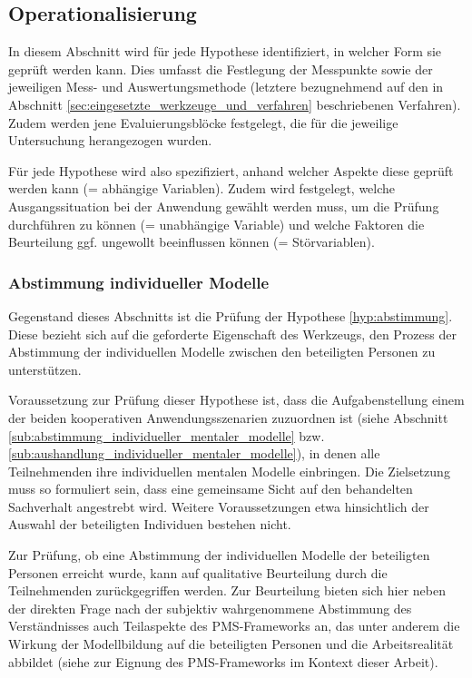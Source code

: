 \subsection{Operationalisierung} %
\label{sub:a_operationalisierung}

In diesem Abschnitt wird für jede Hypothese identifiziert, in welcher Form sie geprüft werden kann. Dies umfasst die Festlegung der Messpunkte sowie der jeweiligen Mess- und Auswertungsmethode (letztere bezugnehmend auf den in Abschnitt \ref{sec:eingesetzte_werkzeuge_und_verfahren} beschriebenen Verfahren). Zudem werden jene Evaluierungsblöcke festgelegt, die für die jeweilige Untersuchung herangezogen wurden.

Für jede Hypothese wird also spezifiziert, anhand welcher Aspekte diese geprüft werden kann (= abhängige Variablen). Zudem wird festgelegt, welche Ausgangssituation bei der Anwendung gewählt werden muss, um die Prüfung durchführen zu können (= unabhängige Variable) und welche Faktoren die Beurteilung ggf. ungewollt beeinflussen können (= Störvariablen).

\subsubsection{Abstimmung individueller Modelle} %
\label{ssub:abstimmung_individueller_modelle}

Gegenstand dieses Abschnitts ist die Prüfung der Hypothese \ref{hyp:abstimmung}. Diese bezieht sich auf die geforderte Eigenschaft des Werkzeugs, den Prozess der Abstimmung der individuellen Modelle zwischen den beteiligten Personen zu unterstützen.

Voraussetzung zur Prüfung dieser Hypothese ist, dass die Aufgabenstellung einem der beiden kooperativen Anwendungsszenarien zuzuordnen ist (siehe Abschnitt \ref{sub:abstimmung_individueller_mentaler_modelle} bzw. \ref{sub:aushandlung_individueller_mentaler_modelle}), in denen alle Teilnehmenden ihre individuellen mentalen Modelle einbringen. Die Zielsetzung muss so formuliert sein, dass eine gemeinsame Sicht auf den behandelten Sachverhalt angestrebt wird. Weitere Voraussetzungen etwa hinsichtlich der Auswahl der beteiligten Individuen bestehen nicht.

Zur Prüfung, ob eine Abstimmung der individuellen Modelle der beteiligten Personen erreicht wurde, kann auf qualitative Beurteilung durch die Teilnehmenden zurückgegriffen werden. Zur Beurteilung bieten sich hier neben der direkten Frage nach der subjektiv wahrgenommene Abstimmung des Verständnisses auch Teilaspekte des \gls{PMS}-Frameworks \citep{Sedera02} an, das unter anderem die Wirkung der Modellbildung auf die beteiligten Personen und die Arbeitsrealität abbildet (siehe \citep{Wahlmuller10} zur Eignung des \gls{PMS}-Frameworks im Kontext dieser Arbeit).


